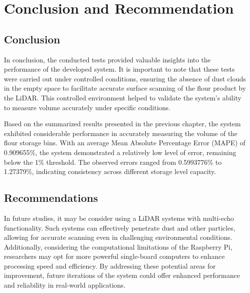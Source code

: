 \renewcommand{\thechapter}{\Roman{chapter}}
\chapter{Conclusion and Recommendation}
\renewcommand{\thechapter}{\arabic{chapter}}
\label{ch:Result and Discussion}
\thispagestyle{empty}

\section{Conclusion}
\label{ch5:sec:conlusion}
In conclusion, the conducted tests provided valuable insights into the performance of the developed system. It is important to note that these tests were carried out under controlled conditions, ensuring the absence of dust clouds in the empty space to facilitate accurate surface scanning of the flour product by the LiDAR. This controlled environment helped to validate the system's ability to measure volume accurately under specific conditions.

Based on the summarized results presented in the previous chapter, the system exhibited considerable performance in accurately measuring the volume of the flour storage bins. With an average Mean Absolute Percentage Error (MAPE) of 0.909655\%, the system demonstrated a relatively low level of error, remaining below the 1\% threshold. The observed errors ranged from 0.5993776\% to 1.27379\%, indicating consistency across different storage level capacity.

\section{Recommendations}
In future studies, it may be consider using a LiDAR systems with multi-echo functionality. Such systems can effectively penetrate dust and other particles, allowing for accurate scanning even in challenging environmental conditions. Additionally, considering the computational limitations of the Raspberry Pi, researchers may opt for more powerful single-board computers to enhance processing speed and efficiency. By addressing these potential areas for improvement, future iterations of the system could offer enhanced performance and reliability in real-world applications.